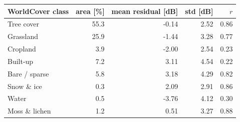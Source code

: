 \begin{tabular}{lrrrr}\toprule
 WorldCover class & area [\%] & mean residual [dB] & std [dB] & $r$\\\midrule
Tree cover & 55.3 & -0.14 & 2.52 & 0.86 \\
Grassland & 25.9 & -1.44 & 3.28 & 0.77 \\
Cropland & 3.9 & -2.00 & 2.54 & 0.23 \\
Built-up & 7.2 & 3.11 & 4.54 & 0.22 \\
Bare / sparse & 5.8 & 3.18 & 4.29 & 0.82 \\
Snow \& ice & 0.3 & 2.09 & 2.91 & 0.86 \\
Water & 0.5 & -3.76 & 4.12 & 0.30 \\
Moss \& lichen & 1.2 & 0.51 & 3.27 & 0.88 \\
\bottomrule\end{tabular}
